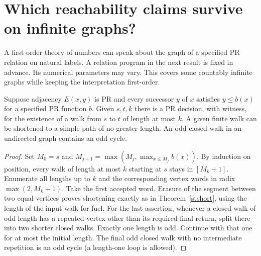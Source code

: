 \section{Which reachability claims survive on infinite graphs?}\label{sec:infinite}
A first-order theory of numbers can speak about the graph of a specified
PR relation on natural labels. A relation program in the next result is fixed
in advance. Its numerical parameters may vary. This covers some countably
infinite graphs while keeping the interpretation first-order.

\begin{proposition}\leavevmode\label{idx:infinite-paths-of-specified-length-in-a-bounded-neighbourhood}
Suppose adjacency $E(x,y)$ is PR and every successor $y$ of $x$ satisfies
$y\le b(x)$ for a specified PR function $b$. Given $s,t,k$ there is a PR
decision, with witness, for the existence of a walk from $s$ to $t$ of length
at most $k$. A given finite walk can be shortened to a simple path of no
greater length. An odd closed walk in an undirected graph contains an odd cycle.
\end{proposition}
\begin{proof}
Set $M_0=s$ and $M_{j+1}=\max(M_j,\max_{x\le M_j}b(x))$. By induction on
position, every walk of length at most $k$ starting at $s$ stays in $[M_k+1]$.
Enumerate all lengths up to $k$ and the corresponding vertex words in
radix $\max(2,M_k+1)$. Take the first accepted word. Erasure of the segment
between two equal vertices proves shortening exactly as in
Theorem~\ref{stshort}, using the length of the input walk for fuel.
For the last assertion, whenever a closed walk of odd length has a repeated
vertex other than its required final return, split there into two shorter
closed walks. Exactly one length is odd. Continue with that one for at most
the initial length. The final odd closed walk with no intermediate repetition
is an odd cycle (a length-one loop is allowed).
\end{proof}


